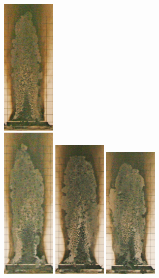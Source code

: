 \documentclass[twoside]{uocthesis}
\begin{document}
\begin{figure}[p]
	\includegraphics[width=1.0in]{../Figures/GBGAS_29_IMG_6250} \\

	\includegraphics[width=1.0in]{../Figures/GBGAS_30_IMG_6269}
	\includegraphics[width=1.0in]{../Figures/GBGAS_31_IMG_6288}
	\includegraphics[width=1.0in]{../Figures/GBGAS_32_IMG_6307}

\end{figure}
\end{document}
